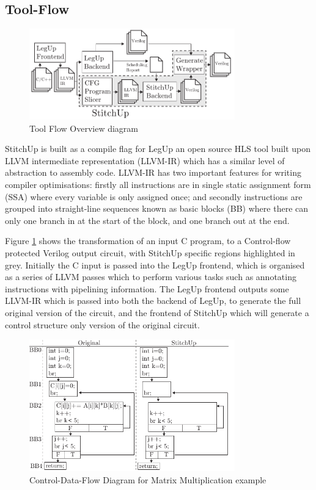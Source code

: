 
\subsection{Tool-Flow}



\begin{figure}[h]
\centering
\includegraphics[width=3.5in]{./imgs/tool-flow.pdf}
\caption{Tool Flow Overview diagram}
\label{fig:tool_flow_diagram}
\end{figure}

StitchUp is built as a compile flag for LegUp an open source HLS tool built upon LLVM intermediate representation (LLVM-IR) which has
a similar level of abstraction to assembly code.
LLVM-IR has two important features for writing compiler optimisations:
firstly all instructions are in single static assignment form (SSA) where every variable is only
assigned once; and secondly instructions are grouped into straight-line sequences known as basic blocks (BB)
where there can only one branch in at the start of the block, and one branch out at the end.

Figure \ref{fig:tool_flow_diagram} shows the transformation of an input C program, to a Control-flow protected
Verilog output circuit, with StitchUp specific regions highlighted in grey.
Initially the C input is passed into the LegUp frontend, which is organised as a series of LLVM passes which
to perform various tasks such as annotating instructions with pipelining information.
The LegUp frontend outputs some LLVM-IR which is passed into both the backend of LegUp, to generate the full
original version of the circuit, and the frontend of StitchUp which will generate a control structure only version
of the original circuit.


\begin{figure}[h]
\centering
\includegraphics[width=3.5in]{./imgs/mmm_cdfg.pdf}
\caption{Control-Data-Flow Diagram for Matrix Multiplication example}
\label{fig:mmm_cdfg}
\end{figure}

